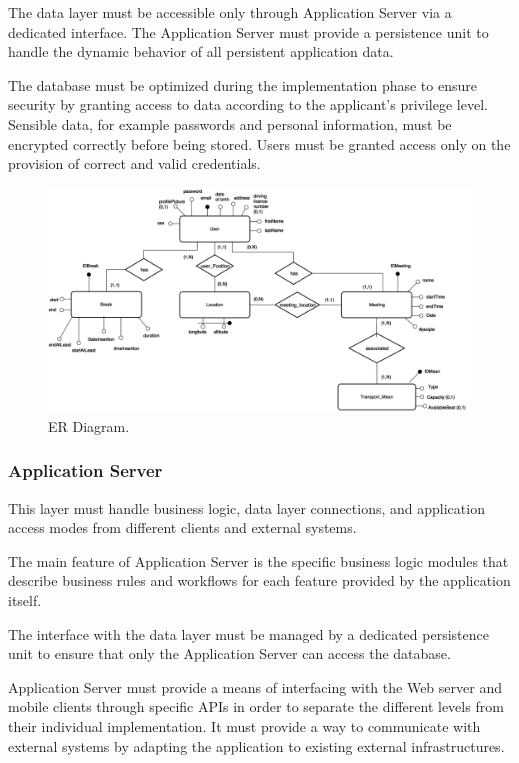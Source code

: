 \documentclass{article}
\begin{document}
	The data layer must be accessible only through Application Server via a dedicated interface. The Application Server must provide a persistence unit to handle the dynamic behavior of all persistent application data.
	
	The database must be optimized during the implementation phase to ensure security by granting access to data according to the applicant's privilege level. Sensible data, for example passwords and personal information, must be encrypted correctly before being stored. Users must be granted access only on the provision of correct and valid credentials.

	\begin{figure}[!ht]
	\centering
	\includegraphics[width=\textwidth]{img/diagrams/er.png}
	\caption{ER Diagram.}
	\end{figure}


	\subsubsection{Application Server}
	This layer must handle business logic, data layer connections, and application access modes from different clients and external systems.
	
	The main feature of Application Server is the specific business logic modules that describe business rules and workflows for each feature provided by the application itself.
	
	The interface with the data layer must be managed by a dedicated persistence unit to ensure that only the Application Server can access the database.
	
	\bigskip
	Application Server must provide a means of interfacing with the Web server and mobile clients through specific APIs in order to separate the different levels from their individual implementation. It must provide a way to communicate with external systems by adapting the application to existing external infrastructures.
	
\end{document}
